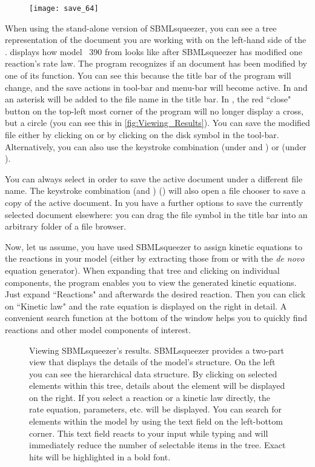 \begin{figure}
\vspace{\wrapfigspace}
\texttt{[image: save\_64]}
\end{figure}
When using the stand-alone version of SBMLsqueezer, you can see a tree representation of the \SBML document you are working with on the left-hand side of the \GUI.
 displays how model \numero~390 from \BioModels \citep{Li2010a} looks like after SBMLsqueezer has modified one reaction's rate law.
The program recognizes if an \SBML document has been modified by one of its function.
You can see this because the title bar of the program will change, and the save actions in tool-bar and menu-bar will become active.
In \Windows and \Linux an asterisk will be added to the file name in the title bar.
In \MacOSX, the red ``close" button on the top-left most corner of the program will no longer display a cross, but a circle (you can see this in \vref{fig:Viewing_Results}).
You can save the modified file either by clicking on  or by clicking on the disk symbol in the tool-bar.
Alternatively, you can also use the keystroke combination  (under \Windows and \Linux) or  (under \MacOSX).

You can always select  in order to save the active \SBML document under a different file name.
The keystroke combination  (\Windows and \Linux)  (\MacOSX) will also open a file chooser to save a copy of the active \SBML document.
In \MacOSX you have a further options to save the currently selected document elsewhere: you can drag the file symbol in the title bar into an arbitrary folder of a file browser.

Now, let us assume, you have used SBMLsqueezer to assign kinetic equations to the reactions in your model (either by extracting those from \SABIO or with the \emph{de novo} equation generator).
When expanding that tree and clicking on individual components, the program enables you to view the generated kinetic equations.
Just expand ``Reactions" and afterwards the desired reaction.
Then you can click on ``Kinetic law" and the rate equation is displayed on the right in detail.
A convenient search function at the bottom of the window helps you to quickly find reactions and other model components of interest.
\begin{figure}[t!]
\caption[Viewing SBMLsqueezer's results]{Viewing SBMLsqueezer's results.
SBMLsqueezer provides a two-part view that displays the details of the model's structure.
On the left you can see the hierarchical \SBML data structure.
By clicking on selected elements within this tree, details about the element will be displayed on the right.
If you select a reaction or a kinetic law directly, the rate equation, parameters, etc. will be displayed.
You can search for elements within the model by using the text field on the left-bottom corner.
This text field reacts to your input while typing and will immediately reduce the number of selectable items in the tree.
Exact hits will be highlighted in a bold font.}
\label{fig:Viewing_Results}
\end{figure}

